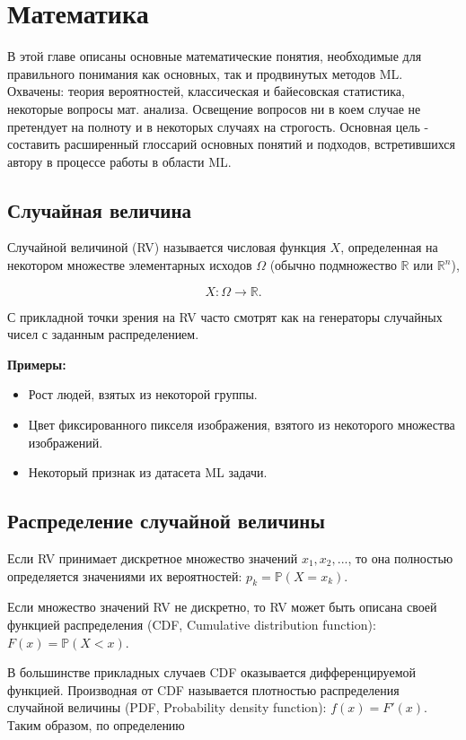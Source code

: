 \chapter{Математика}

В этой главе описаны основные математические понятия, необходимые для правильного понимания как основных, так и продвинутых методов ML. Охвачены: теория вероятностей, классическая и байесовская статистика, некоторые вопросы мат. анализа. Освещение вопросов ни в коем случае не претендует на полноту и в некоторых случаях на строгость. Основная цель - составить расширенный глоссарий основных понятий и подходов, встретившихся автору в процессе работы в области ML.


\section{Случайная величина}

Случайной величиной (RV) называется числовая функция $X$, определенная на некотором множестве элементарных исходов $\Omega$ (обычно подмножество $\mathbb{R}$ или $\mathbb{R}^n$), 

$$
X: \Omega\rightarrow\mathbb{R}.
$$

С прикладной точки зрения на RV часто смотрят как на генераторы случайных чисел с заданным распределением.

\textbf{Примеры:}
\begin{itemize}
    \item Рост людей, взятых из некоторой группы.
    \item Цвет фиксированного пикселя изображения, взятого из некоторого множества изображений.
    \item Некоторый признак из датасета ML задачи.
\end{itemize}


\section{Распределение случайной величины}

Если RV принимает дискретное множество значений $x_1,x_2,...$, то она полностью определяется значениями их вероятностей: $p_k=\mathbb{P}(X=x_k)$.

Если множество значений RV не дискретно, то RV может быть описана своей функцией распределения (CDF, Cumulative distribution function): $F(x)=\mathbb{P}(X<x)$.

В большинстве прикладных случаев CDF оказывается дифференцируемой функцией. Производная от CDF называется плотностью распределения случайной величины (PDF, Probability density function): $f(x)=F'(x)$. Таким образом, по определению 

